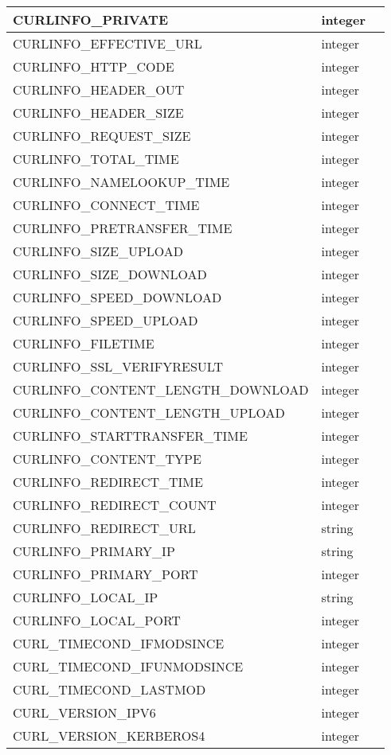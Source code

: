 \begin{longtable}{|m{150pt}|m{40pt}|m{200pt}|}
\hline
CURLINFO\_PRIVATE&integer&\\
\hline
CURLINFO\_EFFECTIVE\_URL&integer&\\
\hline
CURLINFO\_HTTP\_CODE&integer&\\
\hline
CURLINFO\_HEADER\_OUT&integer&\\
\hline
CURLINFO\_HEADER\_SIZE&integer&\\
\hline
CURLINFO\_REQUEST\_SIZE&integer&\\
\hline
CURLINFO\_TOTAL\_TIME&integer&\\
\hline
CURLINFO\_NAMELOOKUP\_TIME&integer&\\
\hline
CURLINFO\_CONNECT\_TIME&integer&\\
\hline
CURLINFO\_PRETRANSFER\_TIME&integer&\\
\hline
CURLINFO\_SIZE\_UPLOAD&integer&\\
\hline
CURLINFO\_SIZE\_DOWNLOAD&integer&\\
\hline
CURLINFO\_SPEED\_DOWNLOAD&integer&\\
\hline
CURLINFO\_SPEED\_UPLOAD&integer&\\
\hline
CURLINFO\_FILETIME&integer&\\
\hline
CURLINFO\_SSL\_VERIFYRESULT&integer&\\
\hline
CURLINFO\_CONTENT\_LENGTH\_DOWNLOAD&integer&\\
\hline
CURLINFO\_CONTENT\_LENGTH\_UPLOAD&integer&\\
\hline
CURLINFO\_STARTTRANSFER\_TIME&integer&\\
\hline
CURLINFO\_CONTENT\_TYPE&integer&\\
\hline
CURLINFO\_REDIRECT\_TIME&integer&\\
\hline
CURLINFO\_REDIRECT\_COUNT&integer&\\
\hline
CURLINFO\_REDIRECT\_URL&string&\\
\hline
CURLINFO\_PRIMARY\_IP&string&\\
\hline
CURLINFO\_PRIMARY\_PORT&integer&\\
\hline
CURLINFO\_LOCAL\_IP&string&\\
\hline
CURLINFO\_LOCAL\_PORT&integer&\\
\hline
CURL\_TIMECOND\_IFMODSINCE&integer&\\
\hline
CURL\_TIMECOND\_IFUNMODSINCE&integer&\\
\hline
CURL\_TIMECOND\_LASTMOD&integer&\\
\hline
CURL\_VERSION\_IPV6&integer&\\
\hline
CURL\_VERSION\_KERBEROS4&integer&\\

\end{longtable}
